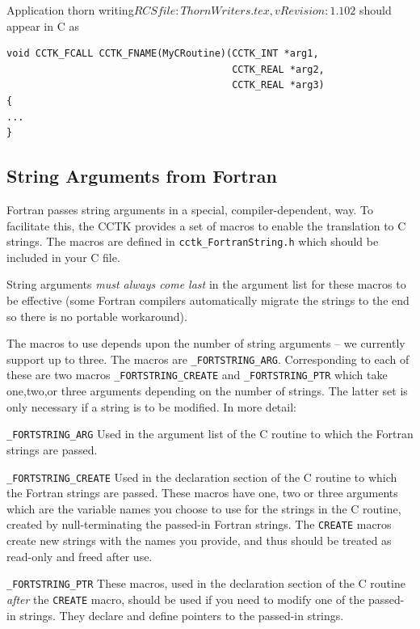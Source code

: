 \begin{cactuspart}{2}{Application thorn writing}{$RCSfile: ThornWriters.tex,v $}{$Revision: 1.102 $}
should appear in C as

\begin{verbatim}
void CCTK_FCALL CCTK_FNAME(MyCRoutine)(CCTK_INT *arg1,
                                       CCTK_REAL *arg2,
                                       CCTK_REAL *arg3)
{
...
}
\end{verbatim}

\subsection{String Arguments from Fortran}

Fortran passes string arguments in a special, compiler-dependent, way.
To facilitate this, the CCTK provides a set of macros to enable the
translation to C strings.
The macros are defined in {\tt cctk\_FortranString.h} which
should be included in your C file.

String arguments {\em must always come last} in the argument list for
these macros to be effective (some Fortran compilers automatically
migrate the strings to the end so there is no portable workaround).

The macros to use depends upon the number of string arguments -- we
currently support up to three.  The macros are
{\tt <ONE|TWO|THREE>\_FORTSTRING\_ARG}.
Corresponding to each of these are two macros
{\tt <ONE|TWO|THREE>\_FORTSTRING\_CREATE} and
{\tt <ONE|TWO|THREE>\_FORTSTRING\_PTR}
which take one,two,or three arguments depending on the number of strings.
The latter set is only necessary if a string is to be modified.
In more detail:

\begin{Lentry}

\item[{\tt <ONE|TWO|THREE>\_FORTSTRING\_ARG}]
	Used in the argument list of the C routine to which the Fortran
	strings are passed.

\item[{\tt <ONE|TWO|THREE>\_FORTSTRING\_CREATE}]
	Used in the declaration section of the C routine to which the Fortran
	strings are passed. These macros have one, two or three arguments
	which are the variable names you choose to use for the strings in
	the C routine, created
	by null-terminating the passed-in Fortran strings. The {\tt CREATE}
	macros create new strings with the names you provide, and thus should
	be treated as read-only and freed after use.

\item[{\tt <ONE|TWO|THREE>\_FORTSTRING\_PTR}]
	These macros, used in the declaration section of the C routine
	{\em after} the {\tt CREATE} macro,
	should be used if you need to modify one of the passed-in strings.
	They declare and define pointers to the passed-in strings.
	

\end{Lentry}
\end{cactuspart}
